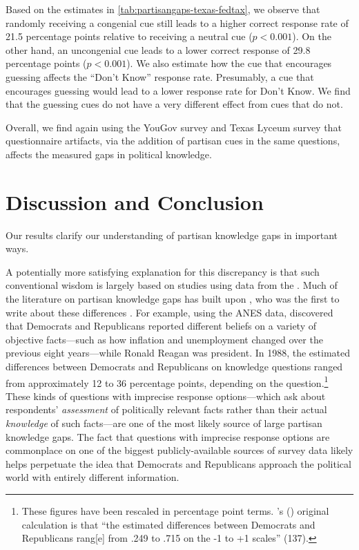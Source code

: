 \documentclass[12pt, letterpaper]{article}
\def\citeapos#1{\citeauthor{#1}'s (\citeyear{#1})}
\begin{document}
Based on the estimates in \cref{tab:partisangaps-texas-fedtax}, we observe that randomly receiving a congenial cue still leads to a higher correct response rate of 21.5 percentage points relative to receiving a neutral cue ($p<0.001$). On the other hand, an uncongenial cue leads to a lower correct response of 29.8 percentage points ($p<0.001$).
We also estimate how the cue that encourages guessing affects the ``Don't Know'' response rate. Presumably, a cue that encourages guessing would lead to a lower response rate for Don't Know. We find that the guessing cues do not have a very different effect from cues that do not. 

Overall, we find again using the YouGov survey and Texas Lyceum survey that questionnaire artifacts, via the addition of partisan cues in the same questions, affects the measured gaps in political knowledge. 


\clearpage
\section*{Discussion and Conclusion}

Our results clarify our understanding of partisan knowledge gaps in important ways. 

A potentially more satisfying explanation for this discrepancy is that such conventional wisdom is largely based on studies using data from the \citet{anes_gen}. Much of the literature on partisan knowledge gaps has built upon \citet{bartels_2002}, who was the first to write about these differences \citep{bullocklenz_2019}. For example, using the ANES data, \citet{bartels_2002} discovered that Democrats and Republicans reported different beliefs on a variety of objective facts---such as how inflation and unemployment changed over the previous eight years---while Ronald Reagan was president. In 1988, the estimated differences between Democrats and Republicans on knowledge questions ranged from approximately 12 to 36 percentage points, depending on the question.\footnote{These figures have been rescaled in percentage point terms. \citeapos{bartels_2002}  original calculation is that ``the estimated differences between Democrats and Republicans rang[e] from .249 to .715 on the -1 to +1 scales'' (137).} These kinds of questions with imprecise response options---which ask about respondents' \textit{assessment} of politically relevant facts rather than their actual \textit{knowledge} of such facts---are one of the most likely source of large partisan knowledge gaps. The fact that questions with imprecise response options are commonplace on one of the biggest publicly-available sources of survey data likely helps perpetuate the idea that Democrats and Republicans approach the political world with entirely different information. 
\end{document}
